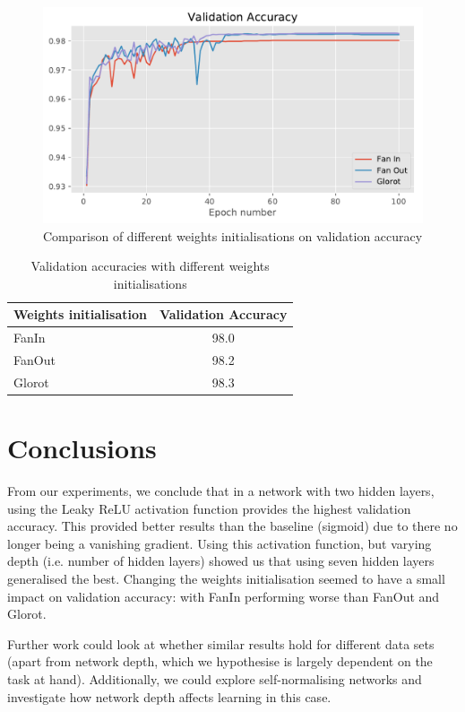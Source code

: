 \documentclass{article}
\begin{document}
\begin{figure}[tb]
\vskip 5mm
\begin{center}
\centerline{\includegraphics[width=\columnwidth]{init_acc}}
\caption{Comparison of different weights initialisations on validation accuracy}
\label{fig:init-val-acc}
\end{center}
\vskip -5mm
\end{figure} 

\begin{table}[tb]
\vskip 3mm
\begin{center}
\begin{small}
\begin{sc}
\begin{tabular}{lc}
\hline
\abovespace\belowspace
Weights initialisation & Validation Accuracy  \\
\hline
\abovespace
FanIn    & 98.0  \\
FanOut  & 98.2  \\
Glorot    & 98.3 \\
\end{tabular}
\end{sc}
\end{small}
\caption{Validation accuracies with different weights initialisations}
\label{tab:init-table}
\end{center}
\vskip -3mm
\end{table}

\section{Conclusions}
\label{sec:concl}
From our experiments, we conclude that in a network with two hidden layers, using the Leaky ReLU activation function provides the highest validation accuracy. This provided better results than the baseline (sigmoid) due to there no longer being a vanishing gradient.  Using this activation function, but varying depth (i.e. number of hidden layers) showed us that using seven hidden layers generalised the best. Changing the weights initialisation seemed to have a small impact on validation accuracy: with FanIn performing worse than FanOut and Glorot. 

Further work could look at whether similar results hold for different data sets (apart from network depth, which we hypothesise is largely dependent on the task at hand). Additionally, we could explore self-normalising networks \citep{Klambauer17} and investigate how network depth affects learning in this case. 

\end{document}
